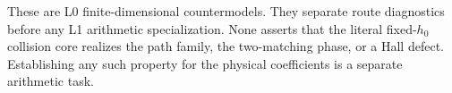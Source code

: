 \begin{remark}
\label{rem:tpc67-countermodel-claim-level}
These are L0 finite-dimensional countermodels.  They separate route
diagnostics before any L1 arithmetic specialization.  None asserts that
the literal fixed-\(h_0\) collision core realizes the path family, the
two-matching phase, or a Hall defect.  Establishing any such property
for the physical coefficients is a separate arithmetic task.
\end{remark}
